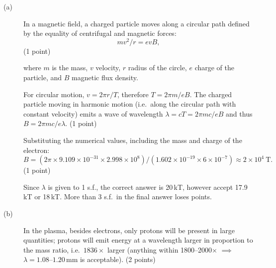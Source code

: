 \begin{description}
\item[(a)] In a magnetic field, a charged particle moves along a circular
  path defined by the equality of centrifugal and magnetic forces:
  \[ mv^2/r = evB, \]
  \hfill(1 point)

  where $m$ is the mass, $v$ velocity, $r$ radius of the circle, $e$ charge
  of the particle, and $B$ magnetic flux density.

  For circular motion, $v = 2\pi r/T$, therefore $T = 2\pi m/eB$. The
  charged particle moving in harmonic motion (i.e.\ along the circular path
  with constant velocity) emits a wave of wavelength
  $\lambda = cT = 2\pi mc/eB$ and thus $B = 2\pi mc/e\lambda$.
  \hfill(1 point)

  Substituting the numerical values, including the mass and charge of the
  electron:
  \[ B = (2\pi\times9.109\times10^{-31}\times2.998\times10^{8})/
     (1.602\times10^{-19}\times6\times10^{-7})
     \approx 2\times10^{4}\ \mathrm{T}. \]
  \hfill(1 point)

  Since $\lambda$ is given to 1 s.f., the correct answer is 20\,kT, however
  accept 17.9\,kT or 18\,kT. More than 3 s.f.\ in the final answer loses
  points.
\item[(b)] In the plasma, besides electrons, only protons will be present in
  large quantities; protons will emit energy at a wavelength larger in
  proportion to the mass ratio, i.e.\ $1836\times$ larger (anything within
  1800--2000$\times$ $\implies$ $\lambda = 1.08$--$1.20$\,mm is acceptable).
  \hfill(2 points)
\end{description}

